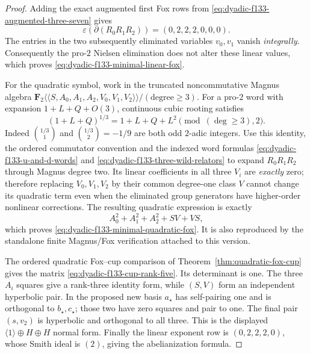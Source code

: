 \documentclass[11pt]{article}
\theoremstyle{definition}
\begin{document}
\begin{proof}
Adding the exact
augmented first
Fox rows from
\eqref{eq:dyadic-f133-augmented-three-seven}
gives
\[
\varepsilon(\partial(R_0R_1R_2))
=(0,2,2,2,0,0,0).
\]
The entries in
the two subsequently
eliminated variables
$v_0,v_1$ vanish
\emph{integrally}.
Consequently the
pro-$2$ Nielsen
elimination does
not alter these
linear values,
which proves
\eqref{eq:dyadic-f133-minimal-linear-fox}.

For the quadratic
symbol, work in
the truncated
noncommutative
Magnus algebra
$\mathbf F_2
\langle\!\langle
S,A_0,A_1,A_2,
V_0,V_1,V_2
\rangle\!\rangle/
(\mathrm{degree}\ge3)$.
For a pro-$2$
word with expansion
$1+L+Q+O(3)$,
continuous cubic
rooting satisfies
\begin{equation}\label{eq:dyadic-f133-magnus-one-third}
\boxed{\quad
(1+L+Q)^{1/3}
=1+L+Q+L^2
\pmod{(\deg\ge3),2}.
\quad}
\end{equation}
Indeed $\binom{1/3}{1}$
and $\binom{1/3}{2}=-1/9$
are both odd
$2$-adic integers.
Use this identity,
the ordered
commutator convention
and the indexed
word formulas
\eqref{eq:dyadic-f133-u-and-d-words}
and
\eqref{eq:dyadic-f133-three-wild-relators}
to expand
$R_0R_1R_2$
through Magnus
degree two.
Its linear
coefficients in
all three
$V_i$ are
\emph{exactly}
zero; therefore
replacing
$V_0,V_1,V_2$
by their
common degree-one
class $V$
cannot change
its quadratic
term even when
the eliminated
group generators
have higher-order
nonlinear
corrections.
The resulting
quadratic expression
is exactly
\[
A_0^2+A_1^2+A_2^2+SV+VS,
\]
which proves
\eqref{eq:dyadic-f133-minimal-quadratic-fox}.
It is also
reproduced by the
standalone finite
Magnus/Fox
verification
attached to
this version.

The ordered
quadratic Fox--cup
comparison
of
Theorem~\ref{thm:quadratic-fox-cup}
gives the matrix
\eqref{eq:dyadic-f133-cup-rank-five}.
Its determinant
is one.
The three
$A_i$ squares
give a rank-three
identity form,
while $(S,V)$
form an
independent
hyperbolic pair.
In the proposed
new basis
$a_\star$
has self-pairing
one and is
orthogonal to
$b_\star,c_\star$;
those two
have zero squares
and pair to one.
The final pair
$(s,v_2)$ is
hyperbolic and
orthogonal to
all three.
This is the
displayed
$\langle1\rangle
\oplus H\oplus H$
normal form.
Finally the
linear exponent
row is $(0,2,2,2,0)$,
whose Smith ideal
is $(2)$, giving
the abelianization
formula.
\end{proof}
\end{document}
